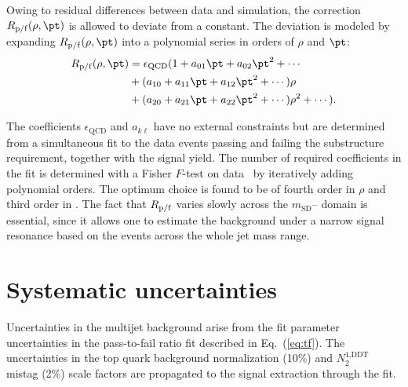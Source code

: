 \documentclass[11pt,twoside,a4paper,cmspaper,final,collab]{cms-tdr}
\begin{document}
Owing to residual differences between data and simulation, 
the correction $R_{\rm p/f}(\rho,\pt)$ is allowed to deviate from a constant. 
The deviation is modeled by expanding $R_{\rm p/f}(\rho,\pt)$ into a polynomial series in orders of $\rho$ and $\pt$:
\begin{align}
\label{eq:tf}
R_{\rm p/f}(\rho, \pt) &=  \epsilon_{\mathrm{QCD}}(1 + a_{01} \pt + a_{02} \pt^2 + \cdots \\
&+ (a_{10}+ a_{11} \pt + a_{12} \pt^2 + \cdots)\rho \nonumber \\
& + (a_{20}+ a_{21} \pt + a_{22} \pt^2+\cdots)\rho^2  +\cdots ) \nonumber.
\end{align}

The coefficients $\epsilon_{\mathrm{QCD}}$ and $a_{k\ell}$
have no external constraints but are
determined from a simultaneous fit to the data events passing and
failing the substructure requirement, together with the signal yield.
The number of required coefficients in the fit is determined with a Fisher $F$-test on
data~\cite{ref:ftest} by iteratively adding polynomial orders. The optimum choice is
found to be of fourth order in $\rho$ and third order in \pt.
The fact that $R_{\rm p/f}$ varies slowly across the $m_\text{SD}$--\pt
domain is essential, since it allows one to estimate the background under a
narrow signal resonance based on the events across the whole jet mass range.
\label{sec:bkg}

\section{Systematic uncertainties}

Uncertainties in the multijet background arise from the fit parameter uncertainties in the pass-to-fail ratio fit 
described in Eq.~(\ref{eq:tf}). 
The uncertainties in the top quark background normalization (10\%) and $N_{2}^\text{1,DDT}$ mistag
(2\%) scale factors are
propagated to the signal extraction through the fit.
\end{document}
